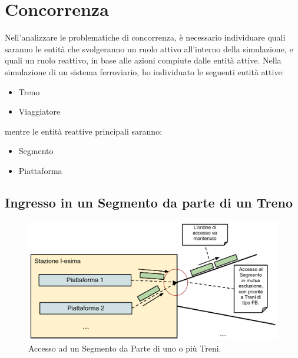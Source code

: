 \newpage
\section{Concorrenza}

	Nell'analizzare le problematiche di concorrenza, è necessario individuare quali saranno le entità che svolgeranno un ruolo attivo all'interno della simulazione, e quali un ruolo reattivo, in base alle azioni compiute dalle entità attive. 
	Nella simulazione di un sistema ferroviario, ho individuato le seguenti entità attive:
		\begin{itemize}
			\item Treno
			\item Viaggiatore
		\end{itemize}
	mentre le entità reattive principali saranno:
		\begin{itemize}
			\item Segmento
			\item Piattaforma
		\end{itemize}
	
	\subsection{Ingresso in un Segmento da parte di un Treno}\label{ingresso_segmento}

	\begin{figure}[htbp]
		\includegraphics[width=\textwidth,keepaspectratio]{imgs/ingresso_segmento.pdf}
		\caption{\footnotesize{Accesso ad un Segmento da Parte di uno o più Treni.}}
	\end{figure}

